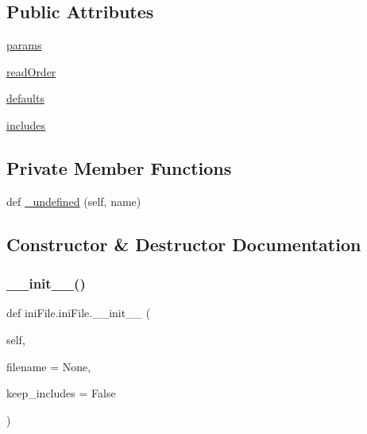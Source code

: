 \subsection*{Public Attributes}
\begin{DoxyCompactItemize}
\item 
\mbox{\hyperlink{classiniFile_1_1iniFile_a9398be892ceaca74049e1f9dfe3ce0ca}{params}}
\item 
\mbox{\hyperlink{classiniFile_1_1iniFile_ad6b8af421837b8b683d1634f3c156a84}{read\+Order}}
\item 
\mbox{\hyperlink{classiniFile_1_1iniFile_a327a685799e72ca8dd56966b0caba760}{defaults}}
\item 
\mbox{\hyperlink{classiniFile_1_1iniFile_aa8bf1f54f5a769b7d610248edc1ae7f3}{includes}}
\end{DoxyCompactItemize}
\subsection*{Private Member Functions}
\begin{DoxyCompactItemize}
\item 
def \mbox{\hyperlink{classiniFile_1_1iniFile_a86334cbd335c1de34ddeef62bc7d934e}{\+\_\+undefined}} (self, name)
\end{DoxyCompactItemize}


\subsection{Constructor \& Destructor Documentation}
\mbox{\label{classiniFile_1_1iniFile_a3485815795ff0a30308502cfc793d99a}} 
\subsubsection{\texorpdfstring{\+\_\+\+\_\+init\+\_\+\+\_\+()}{\_\_init\_\_()}}
{\footnotesize\ttfamily def ini\+File.\+ini\+File.\+\_\+\+\_\+init\+\_\+\+\_\+ (\begin{DoxyParamCaption}\item[{}]{self,  }\item[{}]{filename = {\ttfamily None},  }\item[{}]{keep\+\_\+includes = {\ttfamily False} }\end{DoxyParamCaption})}



